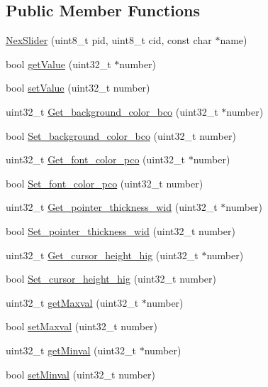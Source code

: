 \subsection*{Public Member Functions}
\begin{DoxyCompactItemize}
\item 
\hyperlink{class_nex_slider_a00c5678209c936e9a57c14b6e2384774}{Nex\+Slider} (uint8\+\_\+t pid, uint8\+\_\+t cid, const char $\ast$name)
\item 
bool \hyperlink{class_nex_slider_a384d5488b421efd6affbfd32f45bb107}{get\+Value} (uint32\+\_\+t $\ast$number)
\item 
bool \hyperlink{class_nex_slider_a3f325bda4db913e302e94a4b25de7b5f}{set\+Value} (uint32\+\_\+t number)
\item 
uint32\+\_\+t \hyperlink{class_nex_slider_a1cf49184702852c0623a695f4b62b1ed}{Get\+\_\+background\+\_\+color\+\_\+bco} (uint32\+\_\+t $\ast$number)
\item 
bool \hyperlink{class_nex_slider_ac22c66fecb8cf03d554c3c86e6e798d5}{Set\+\_\+background\+\_\+color\+\_\+bco} (uint32\+\_\+t number)
\item 
uint32\+\_\+t \hyperlink{class_nex_slider_aa6361627b3c66ee7a569b5cfec4ce562}{Get\+\_\+font\+\_\+color\+\_\+pco} (uint32\+\_\+t $\ast$number)
\item 
bool \hyperlink{class_nex_slider_acc766d430c7a663846e4da6e1bacf76c}{Set\+\_\+font\+\_\+color\+\_\+pco} (uint32\+\_\+t number)
\item 
uint32\+\_\+t \hyperlink{class_nex_slider_a6adbc43b663e3542a92641c406db23ad}{Get\+\_\+pointer\+\_\+thickness\+\_\+wid} (uint32\+\_\+t $\ast$number)
\item 
bool \hyperlink{class_nex_slider_a6b91c1f7fddf7ea1b62c406453110ead}{Set\+\_\+pointer\+\_\+thickness\+\_\+wid} (uint32\+\_\+t number)
\item 
uint32\+\_\+t \hyperlink{class_nex_slider_a680c31b1aa2dc48a1193c9d8fb3cd487}{Get\+\_\+cursor\+\_\+height\+\_\+hig} (uint32\+\_\+t $\ast$number)
\item 
bool \hyperlink{class_nex_slider_a603cf3685c6d843261d8552030af9f22}{Set\+\_\+cursor\+\_\+height\+\_\+hig} (uint32\+\_\+t number)
\item 
uint32\+\_\+t \hyperlink{class_nex_slider_abf1b50605feb0ac2b381d1148795f0d9}{get\+Maxval} (uint32\+\_\+t $\ast$number)
\item 
bool \hyperlink{class_nex_slider_a5a1c65a9f2e21a624b78d5817d695503}{set\+Maxval} (uint32\+\_\+t number)
\item 
uint32\+\_\+t \hyperlink{class_nex_slider_ab98752f15d56dc04de102c0c2180ea11}{get\+Minval} (uint32\+\_\+t $\ast$number)
\item 
bool \hyperlink{class_nex_slider_ad38503fd3a6bfe3eaaa57764ac90f244}{set\+Minval} (uint32\+\_\+t number)
\end{DoxyCompactItemize}
